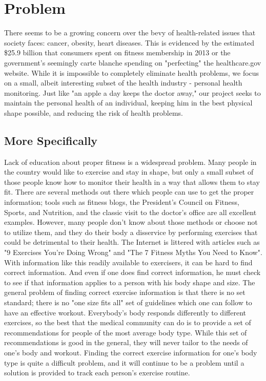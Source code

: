 \documentclass[letterpaper,english, 12pt]{scrreprt}
\begin{document}
\section{Problem}
There seems to be a growing concern over the bevy of health-related issues that society faces: cancer, obesity, heart diseases. This is evidenced by the estimated \$25.9 billion that consumers spent on fitness membership in 2013 or the government's seemingly carte blanche spending on "perfecting" the healthcare.gov website. While it is impossible to completely eliminate health problems, we focus on a small, albeit interesting subset of the health industry - personal health monitoring. Just like "an apple a day keeps the doctor away," our project seeks to maintain the personal health of an individual, keeping him in the best physical shape possible, and reducing the risk of health problems. \\
 
\subsection{More Specifically}
Lack of education about proper fitness is a widespread problem. Many people in the country would like to exercise and stay in shape, but only a small subset of those people know how to monitor their health in a way that allows them to stay fit. There are several methods out there which people can use to get the proper information; tools such as fitness blogs, the President's Council on Fitness, Sports, and Nutrition, and the classic visit to the doctor's office are all excellent examples. However, many people don't know about those methods or choose not to utilize them, and they do their body a disservice by performing exercises that could be detrimental to their health. The Internet is littered with articles such as "9 Exercises You're Doing Wrong" and "The 7 Fitness Myths You Need to Know". With information like this readily available to exercisers, it can be hard to find correct information. And even if one does find correct information, he must check to see if that information applies to a person with his body shape and size. The general problem of finding correct exercise information is that there is no set standard; there is no "one size fits all" set of guidelines which one can follow to have an effective workout. Everybody's body responds differently to different exercises, so the best that the medical community can do is to provide a set of recommendations for people of the most average body type. While this set of recommendations is good in the general, they will never tailor to the needs of one's body and workout. Finding the correct exercise information for one's body type is quite a difficult problem, and it will continue to be a problem until a solution is provided to track each person's exercise routine.\\
 
\end{document}
